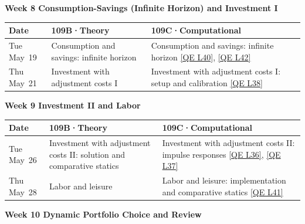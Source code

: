 \vspace{0.8em}
\noindent\textbf{Week 8 \hfill Consumption-Savings (Infinite Horizon) and Investment I}
\vspace{0.3em}

\begin{tabularx}{\textwidth}{@{}p{2.1cm}YY@{}}
\toprule
\textbf{Date} & \textbf{109B\enspace·\enspace Theory} & \textbf{109C\enspace·\enspace Computational} \\
\midrule
Tue May~19 &
Consumption and savings: infinite horizon &
Consumption and savings: infinite horizon \newline
\href{https://julia.quantecon.org/dynamic_programming/perm_income_cons.html}{[QE L40]},
\href{https://julia.quantecon.org/dynamic_programming/ifp.html}{[QE L42]} \\[4pt]
Thu May~21 &
Investment with adjustment costs I &
Investment with adjustment costs I: setup and calibration \newline
\href{https://julia.quantecon.org/dynamic_programming/lqcontrol.html}{[QE L38]} \\
\bottomrule
\end{tabularx}

\vspace{0.8em}
\noindent\textbf{Week 9 \hfill Investment II and Labor}
\vspace{0.3em}

\begin{tabularx}{\textwidth}{@{}p{2.1cm}YY@{}}
\toprule
\textbf{Date} & \textbf{109B\enspace·\enspace Theory} & \textbf{109C\enspace·\enspace Computational} \\
\midrule
Tue May~26 &
Investment with adjustment costs II: solution and comparative statics &
Investment with adjustment costs II: impulse responses \newline
\href{https://julia.quantecon.org/dynamic_programming/coleman_policy_iter.html}{[QE L36]},
\href{https://julia.quantecon.org/dynamic_programming/egm_policy_iter.html}{[QE L37]} \\[4pt]
Thu May~28 &
Labor and leisure &
Labor and leisure: implementation and comparative statics \newline
\href{https://julia.quantecon.org/dynamic_programming/smoothing.html}{[QE L41]} \\
\bottomrule
\end{tabularx}

\vspace{0.8em}
\noindent\textbf{Week 10 \hfill Dynamic Portfolio Choice and Review}
\vspace{0.3em}


